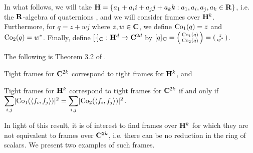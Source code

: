 \documentclass[../../../main]{subfiles}
\begin{document}
In what follows, we will take $\mathbf{H} = \{a_1 + a_ii + a_jj + a_kk :
a_1,a_i,a_j,a_k \in \mathbf{R}\}$, i.e. the $\mathbf{R}$-algebra of quaternions , and we will consider frames over $\mathbf{H}^k$. Furthermore, for $q=z+wj$ where $z,w \in \mathbf{C}$, we define $\text{Co}_1(q)=z$ and $\text{Co}_2(q)=w^*$. Finally, define $[\cdot]_{\mathbf{C}} : \mathbf{H}^d \rightarrow \mathbf{C}^{2d}$ by $[q]_{\mathbf{C}} = \left(\begin{smallmatrix} \text{Co}_1(q) \\ \text{Co}_2(q) \end{smallmatrix}\right) = \left(\begin{smallmatrix} z \\ w^* \end{smallmatrix}\right)$.

The following is Theorem 3.2 of \cite{waldron-quaternions}.

\begin{thm}\label{quaternion-complex-frame-thm}
 \begin{defenum}
  \item Tight frames for $\mathbf{C}^{2k}$ correspond to tight frames for $\mathbf{H}^k$, and
  \item Tight frames for $\mathbf{H}^k$ correspond to tight frames for $\mathbf{C}^{2k}$ if and only if $\ssum_{i,j}\abs{\co(\sharps{f_i,f_j})}^2 = \ssum_{i,j}\abs{\coo(\sharps{f_i,f_j})}^2$.
 \end{defenum}
\end{thm}

In light of this result, it is of interest to find frames over $\mathbf{H}^k$ for which
they are not equivalent to frames over $\mathbf{C}^{2k}$, i.e. there can be no reduction
in the ring of scalars. We present two examples of such frames. 
\end{document}
